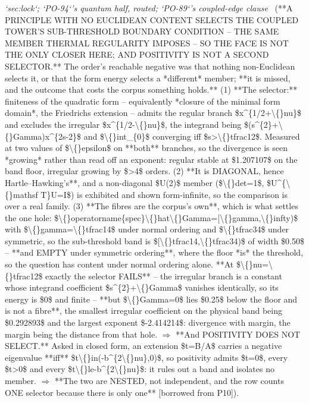 \begin{description}
\textit{`sec:lock`; `PO-94`'s quantum half, routed; `PO-89`'s coupled-edge clause} \ (**A PRINCIPLE WITH NO EUCLIDEAN CONTENT SELECTS THE COUPLED TOWER'S SUB-THRESHOLD BOUNDARY CONDITION -- THE SAME MEMBER THERMAL REGULARITY IMPOSES -- SO THE FACE IS NOT THE ONLY CLOSER HERE; AND POSITIVITY IS NOT A SECOND SELECTOR.** The order's reachable negative was that nothing non-Euclidean selects it, or that the form energy selects a *different* member;  **it is missed, and the outcome that costs the corpus something holds.** (1) **The selector:** finiteness of the quadratic form -- equivalently *closure of the minimal form domain*, the Friedrichs extension -- admits the regular branch \$x\textasciicircum{}\{1/2+\textbackslash\{\}nu\}\$ and excludes the irregular \$x\textasciicircum{}\{1/2-\textbackslash\{\}nu\}\$, the integrand being \$(s\textasciicircum{}\{2\}+\textbackslash\{\}Gamma)x\textasciicircum{}\{2s-2\}\$ and \$\textbackslash\{\}int\_\{0\}\$ converging iff \$s>\textbackslash\{\}tfrac12\$. Measured at two values of \$\textbackslash\{\}epsilon\$ on **both** branches, so the divergence is seen *growing* rather than read off an exponent: regular stable at \$1.207107\$ on the band floor, irregular growing by \$>4\$ orders. (2) **It is DIAGONAL, hence Hartle--Hawking's**, and a non-diagonal \$U(2)\$ member (\$\textbackslash\{\}det=1\$, \$U\textasciicircum{}\{\textbackslash\{\}mathsf T\}U=I\$) is exhibited and shown form-infinite, so the comparison is over a real family. (3) **The fibres are the corpus's own**, which is what settles the one hole: \$\textbackslash\{\}operatorname\{spec\}\textbackslash\{\}hat\textbackslash\{\}Gamma=[\textbackslash\{\}gamma,\textbackslash\{\}infty)\$ with \$\textbackslash\{\}gamma=\textbackslash\{\}tfrac14\$ under normal ordering and \$\textbackslash\{\}tfrac34\$ under symmetric, so the sub-threshold band is \$[\textbackslash\{\}tfrac14,\textbackslash\{\}tfrac34)\$ of width \$0.50\$ -- **and EMPTY under symmetric ordering**, where the floor *is* the threshold, so the question has content under normal ordering alone.  **At \$\textbackslash\{\}nu=\textbackslash\{\}tfrac12\$ exactly the selector FAILS** -- the irregular branch is a constant whose integrand coefficient \$s\textasciicircum{}\{2\}+\textbackslash\{\}Gamma\$ vanishes identically, so its energy is \$0\$ and finite -- **but \$\textbackslash\{\}Gamma=0\$ lies \$0.25\$ below the floor and is not a fibre**, the smallest irregular coefficient on the physical band being \$0.292893\$ and the largest exponent \$-2.414214\$: divergence with margin, the margin being the distance from that hole. \ensuremath{\Rightarrow}  **And POSITIVITY DOES NOT SELECT.** Asked in closed form, an extension \$t=B/A\$ carries a negative eigenvalue **iff** \$t\textbackslash\{\}in(-b\textasciicircum{}\{2\textbackslash\{\}nu\},0)\$, so positivity admits \$t=0\$, every \$t>0\$ and every \$t\textbackslash\{\}le-b\textasciicircum{}\{2\textbackslash\{\}nu\}\$: it rules out a band and isolates no member. \ensuremath{\Rightarrow} **The two are NESTED, not independent, and the row counts ONE selector because there is only one** [borrowed from P10]). 

\end{description}
